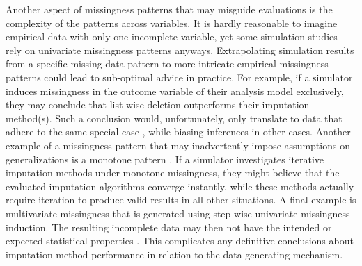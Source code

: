 \documentclass[bimj,fleqn]{w-art}
\begin{document}
Another aspect of missingness patterns that may misguide evaluations is the complexity of the patterns across variables. It is hardly reasonable to imagine empirical data with only one incomplete variable, yet some simulation studies rely on univariate missingness patterns anyways. Extrapolating simulation results from a specific missing data pattern to more intricate empirical missingness patterns could lead to sub-optimal advice in practice. For example, if a simulator induces missingness in the outcome variable of their analysis model exclusively, they may conclude that list-wise deletion outperforms their imputation method(s). Such a conclusion would, unfortunately, only translate to data that adhere to the same special case \citep[described in][\S 2.7]{fimd}, while biasing inferences in other cases. Another example of a missingness pattern that may inadvertently impose assumptions on generalizations is a monotone pattern \citep[i.e. a pattern with uniformly increasing missingness proportions along variables;][]{litt20}. If a simulator investigates iterative imputation methods under monotone missingness, they might believe that the evaluated imputation algorithms converge instantly, while these methods actually require iteration to produce valid results in all other situations. A final example is multivariate missingness that is generated using step-wise univariate missingness induction. The resulting incomplete data may then not have the intended or expected statistical properties \citep[e.g. skewness;][]{ampute}. This complicates any definitive conclusions about imputation method performance in relation to the data generating mechanism.

\end{document}
